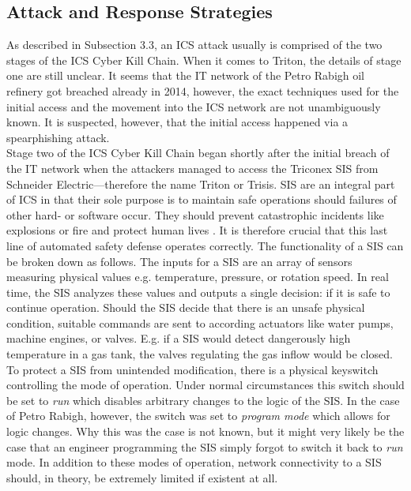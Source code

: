 \documentclass[runningheads]{llncs}
\begin{document}
\subsection{Attack and Response Strategies}
As described in Subsection 3.3, an ICS attack usually is comprised of the two stages of the ICS Cyber Kill Chain.
When it comes to Triton, the details of stage one are still unclear.
It seems that the IT network of the Petro Rabigh oil refinery got breached already in 2014, however, the exact techniques used for the initial access and the movement into the ICS network are not unambiguously known.
It is suspected, however, that the initial access happened via a spearphishing attack. %
\\
Stage two of the ICS Cyber Kill Chain began shortly after the initial breach of the IT network when the attackers managed to access the Triconex SIS from Schneider Electric---therefore the name Triton or Trisis.
SIS are an integral part of ICS in that their sole purpose is to maintain safe operations should failures of other hard- or software occur.
They should prevent catastrophic incidents like explosions or fire and protect human lives \cite{pinto.18}.
It is therefore crucial that this last line of automated safety defense operates correctly.
The functionality of a SIS can be broken down as follows.
The inputs for a SIS are an array of sensors measuring physical values e.g. temperature, pressure, or rotation speed.
In real time, the SIS analyzes these values and outputs a single decision: if it is safe to continue operation.
Should the SIS decide that there is an unsafe physical condition, suitable commands are sent to according actuators like water pumps, machine engines, or valves.
E.g. if a SIS would detect dangerously high temperature in a gas tank, the valves regulating the gas inflow would be closed. \cite{dragos.17} \\
To protect a SIS from unintended modification, there is a physical keyswitch controlling the mode of operation.
Under normal circumstances this switch should be set to \textit{run} which disables arbitrary changes to the logic of the SIS.
In the case of Petro Rabigh, however, the switch was set to \textit{program mode} which allows for logic changes.
Why this was the case is not known, but it might very likely be the case that an engineer programming the SIS simply forgot to switch it back to \textit{run} mode.
In addition to these modes of operation, network connectivity to a SIS should, in theory, be extremely limited if existent at all.
\end{document}
